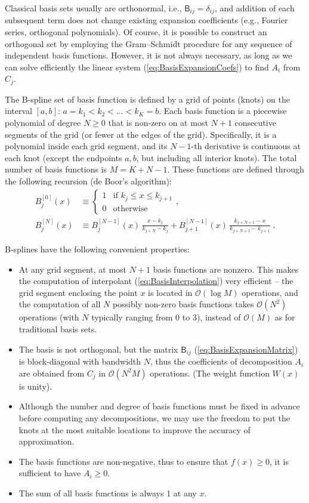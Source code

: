 \documentclass[12pt]{article}
\begin{document}
Classical basis sets usually are orthonormal, i.e., $\mathsf{B}_{ij} = \delta_{ij}$, and addition of each subsequent term does not change existing expansion coefficients (e.g., Fourier series, orthogonal polynomials). Of course, it is possible to construct an orthogonal set by employing the Gram--Schmidt procedure for any sequence of independent basis functions. However, it is not always necessary, as long as we can solve efficiently the linear system (\ref{eq:BasisExpansionCoefs}) to find $A_i$ from $C_j$.

The B-spline set of basis function is defined by a grid of points (knots) on the interval $[a,b]$: $a=k_1<k_2<\dots<k_K=b$. Each basis function is a piecewise polynomial of degree $N\ge 0$ that is non-zero on at most $N+1$ consecutive segments of the grid (or fewer at the edges of the grid). Specifically, it is a polynomial inside each grid segment, and its $N-1$-th derivative is continuous at each knot (except the endpoints $a,b$, but including all interior knots). The total number of basis functions is $M=K+N-1$. These functions are defined through the following recursion (de Boor's algorithm):
\begin{subequations}
\begin{align}
B^{[0]}_j(x) &\equiv \left\{ \begin{array}{ll} 1 &\mbox{if }k_j \le x \le k_{j+1} \\ 0 & \mbox{otherwise} \end{array} \right., \\
B^{[N]}_j(x) &\equiv B^{[N-1]}_j(x)\,\frac{x-k_j}{k_{j+N}-k_j} +
B^{[N-1]}_{j+1}(x)\,\frac{k_{j+N+1}-x}{k_{j+N+1}-k_{j+1}} \;.
\end{align}
\end{subequations}

B-splines have the following convenient properties:
\begin{itemize}
\item At any grid segment, at most $N+1$ basis functions are nonzero. This makes the computation of interpolant (\ref{eq:BasisInterpolation}) very efficient -- the grid segment enclosing the point $x$ is located in $\mathcal{O}(\log M)$ operations, and the computation of all $N$ possibly non-zero basis functions takes $\mathcal{O}(N^2)$ operations (with $N$ typically ranging from 0 to 3), instead of $\mathcal{O}(M)$ as for traditional basis sets.
\item The basis is not orthogonal, but the matrix $\mathsf{B}_{ij}$ (\ref{eq:BasisExpansionMatrix}) is block-diagonal with bandwidth $N$, thus the coefficients of decomposition $A_i$ are obtained from $C_j$ in $\mathcal{O}(N^2M)$ operations. (The weight function $W(x)$ is unity).
\item Although the number and degree of basis functions must be fixed in advance before computing any decompositions, we may use the freedom to put the knots at the most suitable locations to improve the accuracy of approximation.
\item The basis functions are non-negative, thus to ensure that $f(x) \ge 0$, it is sufficient to have $A_i\ge 0$. 
\item The sum of all basis functions is always 1 at any $x$.
\end{itemize}
\end{document}
